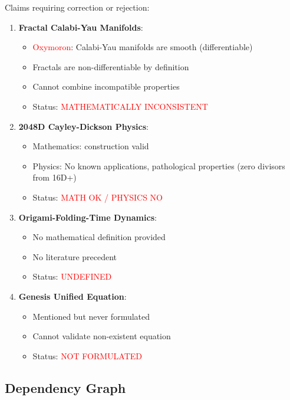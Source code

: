 Claims requiring correction or rejection:

\begin{enumerate}
    \item \textbf{Fractal Calabi-Yau Manifolds}:
    \begin{itemize}
        \item \textcolor{red}{Oxymoron}: Calabi-Yau manifolds are smooth (differentiable)
        \item Fractals are non-differentiable by definition
        \item Cannot combine incompatible properties
        \item Status: \textcolor{red}{MATHEMATICALLY INCONSISTENT}
    \end{itemize}

    \item \textbf{2048D Cayley-Dickson Physics}:
    \begin{itemize}
        \item Mathematics: construction valid
        \item Physics: No known applications, pathological properties (zero divisors from 16D+)
        \item Status: \textcolor{red}{MATH OK / PHYSICS NO}
    \end{itemize}

    \item \textbf{Origami-Folding-Time Dynamics}:
    \begin{itemize}
        \item No mathematical definition provided
        \item No literature precedent
        \item Status: \textcolor{red}{UNDEFINED}
    \end{itemize}

    \item \textbf{Genesis Unified Equation}:
    \begin{itemize}
        \item Mentioned but never formulated
        \item Cannot validate non-existent equation
        \item Status: \textcolor{red}{NOT FORMULATED}
    \end{itemize}
\end{enumerate}

\subsection{Dependency Graph}

